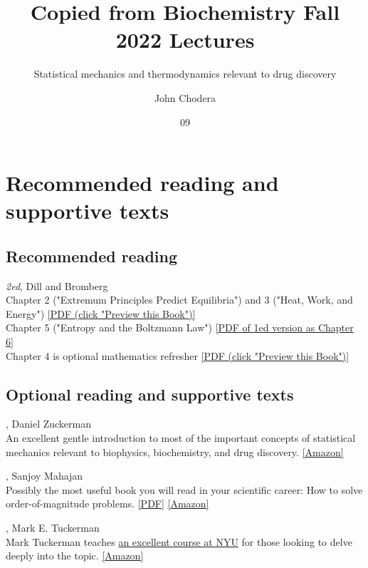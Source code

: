\documentclass[english,course]{lecture}
\title{Copied from Biochemistry Fall 2022 Lectures}
\subtitle{Statistical mechanics and thermodynamics relevant to drug discovery}
\author{John Chodera}
\date{09}{09}{2022}
\begin{document}
\vfill
\eject


\section{Recommended reading and supportive texts}

\subsection*{Recommended reading}

 \emph{2ed}, Dill and Bromberg\\
Chapter 2 ("Extremum Principles Predict Equilibria") and 3 ("Heat, Work, and Energy") \href{https://tinyurl.com/dill-bromberg-preview}{[PDF (click "Preview this Book")]}\\
Chapter 5 ("Entropy and the Boltzmann Law") \href{https://tinyurl.com/dill-bromberg-boltzmann}{[PDF of 1ed version as Chapter 6]}\\
Chapter 4 is optional mathematics refresher \href{https://tinyurl.com/dill-bromberg-preview}{[PDF (click "Preview this Book")]}

\subsection*{Optional reading and supportive texts}

, Daniel Zuckerman \\
An excellent gentle introduction to most of the important concepts of statistical mechanics relevant to biophysics, biochemistry, and drug discovery. 
\href{https://www.amazon.com/dp/B005H6YEBI}{[Amazon]} 

, Sanjoy Mahajan \\
Possibly the most useful book you will read in your scientific career: How to solve order-of-magnitude problems.
\href{https://tinyurl.com/street-fighting-mathematics}{[PDF]}
\href{https://www.amazon.com/exec/obidos/ASIN/026251429X}{[Amazon]}

, Mark E. Tuckerman \\
Mark Tuckerman teaches \href{http://www.nyu.edu/classes/tuckerman/stat.mech/}{an excellent course at NYU} for those looking to delve deeply into the topic.
\href{https://www.amazon.com/Statistical-Mechanics-Molecular-Simulation-Graduate/dp/0198525265}{[Amazon]}
\end{document}
